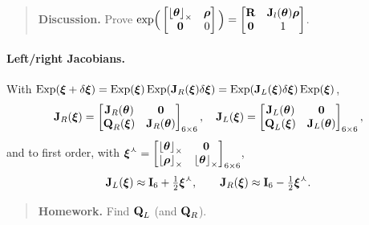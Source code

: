 \begin{quote}
\textbf{Discussion.} Prove $\exp\!\Big(\begin{bmatrix}\skewsym{\vect{\theta}} & \vect{\rho}\\ \vect{0} & 0\end{bmatrix}\Big) = \begin{bmatrix}\vect{R} & \vect{J}_l(\vect{\theta})\vect{\rho}\\ \vect{0} & 1\end{bmatrix}$.
\end{quote}

\paragraph{Left/right Jacobians.} With $\Exp(\vect{\xi}+\delta\vect{\xi}) = \Exp(\vect{\xi})\Exp(\vect{J}_R(\vect{\xi})\delta\vect{\xi}) = \Exp(\vect{J}_L(\vect{\xi})\delta\vect{\xi})\Exp(\vect{\xi})$,
\begin{align}
\vect{J}_R(\vect{\xi}) = \begin{bmatrix} \vect{J}_R(\vect{\theta}) & \vect{0} \\ \vect{Q}_R(\vect{\xi}) & \vect{J}_R(\vect{\theta}) \end{bmatrix}_{6\times6}, \quad
\vect{J}_L(\vect{\xi}) = \begin{bmatrix} \vect{J}_L(\vect{\theta}) & \vect{0} \\ \vect{Q}_L(\vect{\xi}) & \vect{J}_L(\vect{\theta}) \end{bmatrix}_{6\times6},
\end{align}
and to first order, with $\vect{\xi}^{\curlywedge} = \begin{bmatrix}\skewsym{\vect{\theta}} & \vect{0}\\ \skewsym{\vect{\rho}} & \skewsym{\vect{\theta}}\end{bmatrix}_{6\times6}$,
\begin{align}
\vect{J}_L(\vect{\xi}) \approx \vect{I}_6 + \tfrac{1}{2}\vect{\xi}^{\curlywedge}, \qquad
\vect{J}_R(\vect{\xi}) \approx \vect{I}_6 - \tfrac{1}{2}\vect{\xi}^{\curlywedge}.
\end{align}
\begin{quote}
\textbf{Homework.} Find $\vect{Q}_L$ (and $\vect{Q}_R$).
\end{quote}

